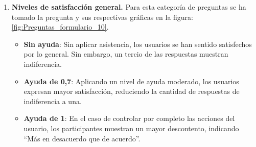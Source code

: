\begin{enumerate}
\begin{itemize}
                  \item \textbf{Ayuda de 1}: Con asistencia total, las respuestas 
    sobre la adecuación de la velocidad se mantienen mayoritariamente 
    favorables, aunque con una mayor presencia de valoraciones discordantes 
    respecto al nivel anterior. Esta divergencia puede atribuirse a que, con 
    el máximo nivel de asistencia, los participantes logran sobrevivir durante 
    períodos considerablemente más prolongados, lo que, combinado con el 
    incremento progresivo de la dificultad inherente a cada juego —mayor 
    frecuencia de aparición de enemigos en \textit{Project Arrows} y 
    estrechamiento progresivo del camino en \textit{Endless Wave Runner}— 
    resulta en una mayor variabilidad en la percepción de la velocidad, ya 
    que a mayor tiempo de supervivencia, menor margen temporal para ejecutar 
    acciones o tomar decisiones. Esta misma dinámica se ve reflejada en las 
    respuestas sobre la frustración percibida por la lentitud del juego, donde 
    la gran mayoría de los participantes afirma no haberse sentido frustrada 
    por la velocidad, lo que sugiere que, pese a la mayor exigencia del juego 
    en etapas avanzadas, la experiencia en términos de fluidez sigue siendo 
    valorada positivamente.
            \end{itemize}
      \item \textbf{Niveles de satisfacción general.} Para esta categoría de preguntas se ha tomado la pregunta y sus respectivas gráficas en la figura: \ref{fig:Preguntas_formulario_10}.
            \begin{itemize}
                  \item \textbf{Sin ayuda}: Sin aplicar asistencia, los usuarios se han sentido satisfechos por lo general. Sin embargo, un tercio de las respuestas muestran indiferencia.
                  \item \textbf{Ayuda de 0,7}: Aplicando un nivel de ayuda moderado, los usuarios expresan mayor satisfacción, reduciendo la cantidad de respuestas de indiferencia a una.
                  \item \textbf{Ayuda de 1}: En el caso de controlar por completo las acciones del usuario, los participantes muestran un mayor descontento, indicando ``Más en desacuerdo que de acuerdo''.
            \end{itemize}
\end{enumerate}